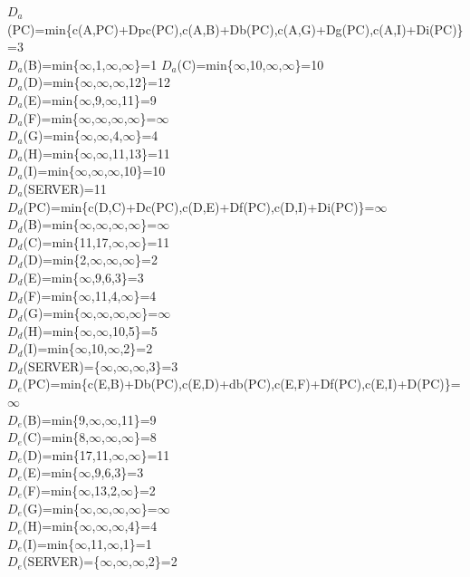 \documentclass{article}
\begin{document}
$D_a$(PC)=min\{c(A,PC)+Dpc(PC),c(A,B)+Db(PC),c(A,G)+Dg(PC),c(A,I)+Di(PC)\}=3\\
$D_a$(B)=min\{$\infty$,1,$\infty$,$\infty$\}=1
$D_a$(C)=min\{$\infty$,10,$\infty$,$\infty$\}=10\\
$D_a$(D)=min\{$\infty$,$\infty$,$\infty$,12\}=12\\
$D_a$(E)=min\{$\infty$,9,$\infty$,11\}=9\\
$D_a$(F)=min\{$\infty$,$\infty$,$\infty$,$\infty$\}=$\infty$\\
$D_a$(G)=min\{$\infty$,$\infty$,4,$\infty$\}=4\\
$D_a$(H)=min\{$\infty$,$\infty$,11,13\}=11\\
$D_a$(I)=min\{$\infty$,$\infty$,$\infty$,10\}=10\\
$D_a$(SERVER)=11\\


$D_d$(PC)=min\{c(D,C)+Dc(PC),c(D,E)+Df(PC),c(D,I)+Di(PC)\}=$\infty$\\
$D_d$(B)=min\{$\infty$,$\infty$,$\infty$,$\infty$\}=$\infty$\\
$D_d$(C)=min\{11,17,$\infty$,$\infty$\}=11\\
$D_d$(D)=min\{2,$\infty$,$\infty$,$\infty$\}=2\\
$D_d$(E)=min\{$\infty$,9,6,3\}=3\\
$D_d$(F)=min\{$\infty$,11,4,$\infty$\}=4\\
$D_d$(G)=min\{$\infty$,$\infty$,$\infty$,$\infty$\}=$\infty$\\
$D_d$(H)=min\{$\infty$,$\infty$,10,5\}=5\\
$D_d$(I)=min\{$\infty$,10,$\infty$,2\}=2\\
$D_d$(SERVER)=\{$\infty$,$\infty$,$\infty$,3\}=3\\

$D_e$(PC)=min\{c(E,B)+Db(PC),c(E,D)+db(PC),c(E,F)+Df(PC),c(E,I)+D(PC)\}=$\infty$\\
$D_e$(B)=min\{9,$\infty$,$\infty$,11\}=9\\
$D_e$(C)=min\{8,$\infty$,$\infty$,$\infty$\}=8\\
$D_e$(D)=min\{17,11,$\infty$,$\infty$\}=11\\
$D_e$(E)=min\{$\infty$,9,6,3\}=3\\
$D_e$(F)=min\{$\infty$,13,2,$\infty$\}=2\\
$D_e$(G)=min\{$\infty$,$\infty$,$\infty$,$\infty$\}=$\infty$\\
$D_e$(H)=min\{$\infty$,$\infty$,$\infty$,4\}=4\\
$D_e$(I)=min\{$\infty$,11,$\infty$,1\}=1\\
$D_e$(SERVER)=\{$\infty$,$\infty$,$\infty$,2\}=2\\
\end{document}
